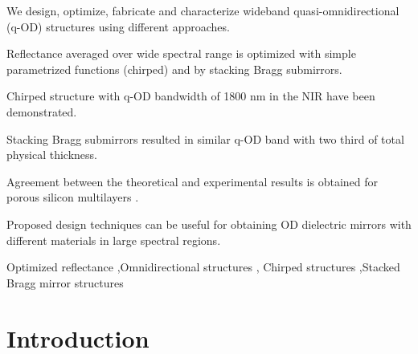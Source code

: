 \documentclass[a4paper,fleqn]{cas-sc}
\begin{document}
\begin{highlights}
\item We design, optimize, fabricate and characterize
  wideband quasi-omnidirectional (q-OD) structures
  using different approaches.
\item Reflectance averaged over wide spectral range is
  optimized with simple parametrized functions
  (chirped) and by stacking Bragg submirrors.
\item Chirped structure with q-OD bandwidth of 1800 nm
  in the NIR have been demonstrated.
\item Stacking Bragg submirrors resulted in similar
  q-OD band with two third of total physical
  thickness.
\item Agreement between the theoretical and
  experimental results is obtained for porous silicon
  multilayers .
\item Proposed design techniques can be useful for
  obtaining OD dielectric mirrors with different
  materials in large spectral regions.
\end{highlights}

\begin{keywords}
  Optimized reflectance \sep Omnidirectional structures \sep
  Chirped structures \sep Stacked Bragg mirror structures
\end{keywords}

\maketitle

\section{Introduction}
\end{document}
